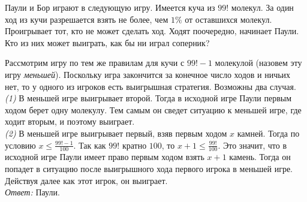 Паули и Бор играют в следующую игру.
Имеется куча из $99!$ молекул.
За один ход из кучи разрешается взять не более, чем $1\%$ от оставшихся
молекул.
Проигрывает тот, кто не может сделать ход.
Ходят поочередно, начинает Паули.
Кто из них может выиграть, как бы ни играл соперник?

\solution
Рассмотрим игру по тем же правилам для кучи с $99! - 1$ молекулой
(назовем эту игру \emph{меньшей}).
Поскольку игра закончится за конечное число ходов и ничьих нет, то у одного из
игроков есть выигрышная стратегия.
Возможны два случая.
\\
\emph{(1)}
В меньшей игре выигрывает второй.
Тогда в исходной игре Паули первым ходом берет одну молекулу.
Тем самым он сведет ситуацию к меньшей игре, где ходит вторым, и поэтому
выиграет.
\\
\emph{(2)}
В меньшей игре выигрывает первый, взяв первым ходом $x$ камней.
Тогда по условию $x \leq \frac{99! - 1}{100}$.
Так как $99!$ кратно $100$, то $x + 1 \leq \frac{99!}{100}$.
Это значит, что в исходной игре Паули имеет право первым ходом взять $x + 1$
камень.
Тогда он попадет в ситуацию после выигрышного хода первого игрока в меньшей
игре.
Действуя далее как этот игрок, он выиграет.
\\
\emph{Ответ:} Паули.

